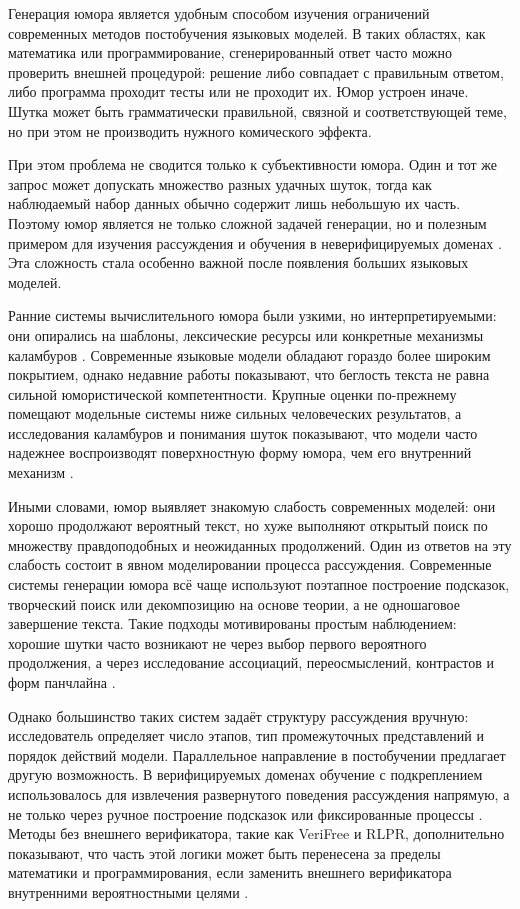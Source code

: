 Генерация юмора является удобным способом изучения ограничений современных методов постобучения языковых моделей. В таких областях, как математика или программирование, сгенерированный ответ часто можно проверить внешней процедурой: решение либо совпадает с правильным ответом, либо программа проходит тесты или не проходит их. Юмор устроен иначе. Шутка может быть грамматически правильной, связной и соответствующей теме, но при этом не производить нужного комического эффекта.

При этом проблема не сводится только к субъективности юмора. Один и тот же запрос может допускать множество разных удачных шуток, тогда как наблюдаемый набор данных обычно содержит лишь небольшую их часть. Поэтому юмор является не только сложной задачей генерации, но и полезным примером для изучения рассуждения и обучения в неверифицируемых доменах \citep{Loakman2025,lemmens2026computational}. Эта сложность стала особенно важной после появления больших языковых моделей.

Ранние системы вычислительного юмора были узкими, но интерпретируемыми: они опирались на шаблоны, лексические ресурсы или конкретные механизмы каламбуров \citep{ritchie2001current,amin2020survey}. Современные языковые модели обладают гораздо более широким покрытием, однако недавние работы показывают, что беглость текста не равна сильной юмористической компетентности. Крупные оценки по-прежнему помещают модельные системы ниже сильных человеческих результатов, а исследования каламбуров и понимания шуток показывают, что модели часто надежнее воспроизводят поверхностную форму юмора, чем его внутренний механизм \citep{Zhang2024HumorAI,xu2024good,cocchieri2025you,loakman2025comparing}.

Иными словами, юмор выявляет знакомую слабость современных моделей: они хорошо продолжают вероятный текст, но хуже выполняют открытый поиск по множеству правдоподобных и неожиданных продолжений. Один из ответов на эту слабость состоит в явном моделировании процесса рассуждения. Современные системы генерации юмора всё чаще используют поэтапное построение подсказок, творческий поиск или декомпозицию на основе теории, а не одношаговое завершение текста. Такие подходы мотивированы простым наблюдением: хорошие шутки часто возникают не через выбор первого вероятного продолжения, а через исследование ассоциаций, переосмыслений, контрастов и форм панчлайна \citep{chen2023prompt,zhong2024let,Tikhonov2024,Kim2025,ZhangJ2025}.

Однако большинство таких систем задаёт структуру рассуждения вручную: исследователь определяет число этапов, тип промежуточных представлений и порядок действий модели. Параллельное направление в постобучении предлагает другую возможность. В верифицируемых доменах обучение с подкреплением использовалось для извлечения развернутого поведения рассуждения напрямую, а не только через ручное построение подсказок или фиксированные процессы \citep{Lightman2023,DeepSeek2025}. Методы без внешнего верификатора, такие как VeriFree и RLPR, дополнительно показывают, что часть этой логики может быть перенесена за пределы математики и программирования, если заменить внешнего верификатора внутренними вероятностными целями \citep{Zhou2025,Yu2025}.

